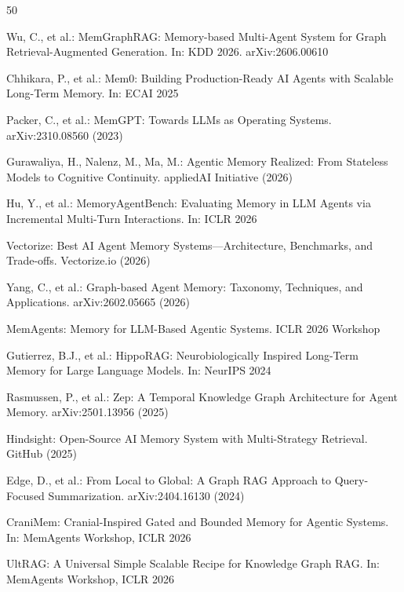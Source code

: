 \documentclass[hf]{ceurart}
\begin{document}
\begin{thebibliography}{50}

Wu, C., et al.: MemGraphRAG: Memory-based Multi-Agent System for
Graph Retrieval-Augmented Generation. In: KDD 2026.
arXiv:2606.00610

Chhikara, P., et al.: Mem0: Building Production-Ready AI Agents with
Scalable Long-Term Memory. In: ECAI 2025

Packer, C., et al.: MemGPT: Towards LLMs as Operating Systems.
arXiv:2310.08560 (2023)

Gurawaliya, H., Nalenz, M., Ma, M.: Agentic Memory Realized: From
Stateless Models to Cognitive Continuity. appliedAI Initiative (2026)

Hu, Y., et al.: MemoryAgentBench: Evaluating Memory in LLM Agents via
Incremental Multi-Turn Interactions. In: ICLR 2026

Vectorize: Best AI Agent Memory Systems---Architecture, Benchmarks,
and Trade-offs. Vectorize.io (2026)

Yang, C., et al.: Graph-based Agent Memory: Taxonomy, Techniques,
and Applications. arXiv:2602.05665 (2026)

MemAgents: Memory for LLM-Based Agentic Systems. ICLR 2026 Workshop

Gutierrez, B.J., et al.: HippoRAG: Neurobiologically Inspired
Long-Term Memory for Large Language Models. In: NeurIPS 2024

Rasmussen, P., et al.: Zep: A Temporal Knowledge Graph Architecture
for Agent Memory. arXiv:2501.13956 (2025)

Hindsight: Open-Source AI Memory System with Multi-Strategy Retrieval.
GitHub (2025)

Edge, D., et al.: From Local to Global: A Graph RAG Approach to
Query-Focused Summarization. arXiv:2404.16130 (2024)

CraniMem: Cranial-Inspired Gated and Bounded Memory for Agentic
Systems. In: MemAgents Workshop, ICLR 2026

UltRAG: A Universal Simple Scalable Recipe for Knowledge Graph RAG.
In: MemAgents Workshop, ICLR 2026


\end{thebibliography}
\end{document}
